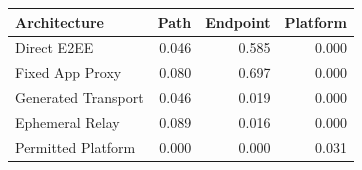 \begin{tabular}{lrrr}
\toprule
Architecture & Path & Endpoint & Platform \\
\midrule
Direct E2EE & 0.046 & 0.585 & 0.000 \\
Fixed App Proxy & 0.080 & 0.697 & 0.000 \\
Generated Transport & 0.046 & 0.019 & 0.000 \\
Ephemeral Relay & 0.089 & 0.016 & 0.000 \\
Permitted Platform & 0.000 & 0.000 & 0.031 \\
\bottomrule
\end{tabular}
